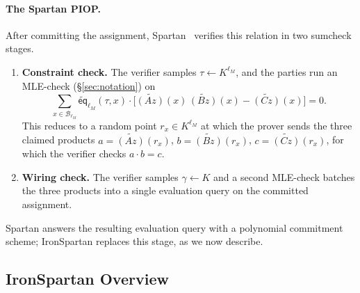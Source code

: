 \documentclass{article}
\theoremstyle{definition}
\newcommand*{\mle}{\widetilde}
\newcommand{\eq}{\mathsf{eq}}
\newcommand{\BB}{\mathcal{B}}
\begin{document}
\paragraph{The Spartan PIOP.}
After committing the assignment, Spartan~\cite{Setty:2020aa} verifies this relation in two sumcheck stages.
\begin{enumerate}
\item \textbf{Constraint check.} The verifier samples $\tau \gets K^{\ell_M}$, and the parties run an MLE-check (\S\ref{sec:notation}) on
\[
  \sum_{x \in \BB_{\ell_M}} \mle{\eq}_{\ell_M}(\tau, x) \cdot \bigl[ \mle{(Az)}(x)\, \mle{(Bz)}(x) - \mle{(Cz)}(x) \bigr] = 0.
\]
This reduces to a random point $r_x \in K^{\ell_M}$ at which the prover sends the three claimed products $a = \mle{(Az)}(r_x)$, $b = \mle{(Bz)}(r_x)$, $c = \mle{(Cz)}(r_x)$, for which the verifier checks $a \cdot b = c$.
\item \textbf{Wiring check.} The verifier samples $\gamma \gets K$ and a second MLE-check batches the three products into a single evaluation query on the committed assignment.
\end{enumerate}
Spartan answers the resulting evaluation query with a polynomial commitment scheme; IronSpartan replaces this stage, as we now describe.

\subsection{IronSpartan Overview}
\label{sec:ironspartan-overview}
\end{document}
